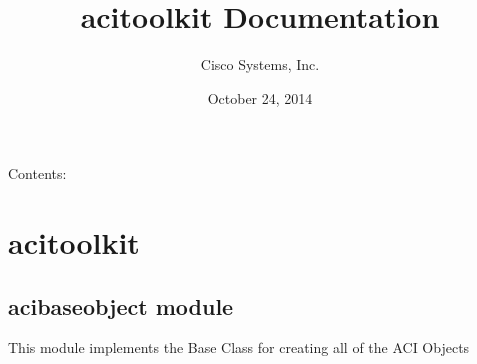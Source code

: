 \documentclass[letterpaper,10pt,english]{sphinxmanual}
\title{acitoolkit Documentation}
\date{October 24, 2014}
\author{Cisco Systems, Inc.}
\begin{document}
\maketitle
\tableofcontents
{}\label{index::doc}


Contents:


\chapter{acitoolkit}
\label{modules:welcome-to-acitoolkit-s-documentation}\label{modules::doc}\label{modules:acitoolkit}

\section{acibaseobject module}
\label{acibaseobject:module-acibaseobject}\label{acibaseobject::doc}\label{acibaseobject:acibaseobject-module}
This module implements the Base Class for creating all of the ACI Objects
\end{document}
